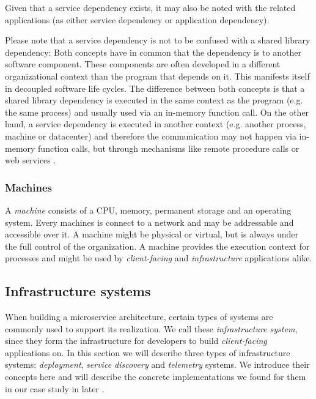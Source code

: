 Given that a service dependency exists, it may also be noted with the related applications (as either service dependency or application dependency).

Please note that a service dependency is not to be confused with a shared library dependency: Both concepts have in common that the dependency is to another software component. These components are often developed in a different organizational context than the program that depends on it. This manifests itself in decoupled software life cycles. The difference between both concepts is that a shared library dependency is executed in the same context as the program (e.g. the same process) and usually used via an in-memory function call. On the other hand, a service dependency is executed in another context (e.g. another process, machine or datacenter) and therefore the communication may not happen via in-memory function calls, but through mechanisms like remote procedure calls \cite{Birrell1984} or web services \cite{wsw3c}.

\subsubsection{Machines}

A \emph{machine} consists of a CPU, memory, permanent storage and an operating system. Every machines is connect to a network and may be addressable and accessible over it. A machine might be physical or virtual, but is always under the full control of the organization. A machine provides the execution context for processes and might be used by \emph{client-facing} and \emph{infrastructure} applications alike.

\subsection{Infrastructure systems}
\label{subsec:infrastructure}

When building a microservice architecture, certain types of systems are commonly used to support its realization. We call these \emph{infrastructure system}, since they form the infrastructure for developers to build \emph{client-facing} applications on. In this section we will describe three types of infrastructure systems: \emph{deployment}, \emph{service discovery} and \emph{telemetry} systems. We introduce their concepts here and will describe the concrete implementations we found for them in our case study in later .


